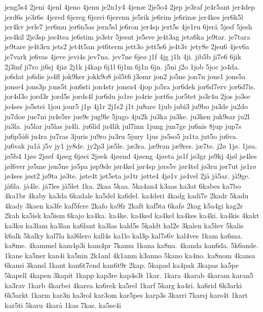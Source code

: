 {jeng5s4
2jeni
4jenl
4jeno
4jenu
je2n1y4
4jen^^e6
2je5o4
2jep
je3raf
je4r5ant
jer4dep
jerd6s
je3r6e
4jered
6jereg
6jerei
6jerenn
je5rik
je6rim
je6rin^^e6
jer4kes
jer6k5l
jer4kv
jerle7
jer6mu
jer6n5as
jern5sl
je6ron
jer4sp
jert5s
4je1ru
6jer^^e5
5jesf
5jesh
jes4kil
2je3sp
jes4tea
je6stim
je3str
5jesut
je5sve
je4t3ag
jeta6ka
je9tar.
je7tara
je9tare
je4t3ru
jets2
jet4t5an
jet6term
jett3o
jett5s6
je4t3v
jety8e
2jeu6
4jev6a
je7vark
je6vas
4jeve
jevi4s
jev7na.
jev7ne
6je^^f8
j1f
4jg
j1h
4ji.
jib5b
ji7e6
6jik
2j3inf
ji7ro
ji6sj
4ji^^f8
2j1k
j4kap
6j1l
6j1m
6j1n
6jn.
j5ni
j2o
1job
5joc
jo4da.
jo6dat
jo6dis
jo4fl
jok9ker
jokk9o8
jol5t6
j3omr
jon2
jo5ne
jon7n
jons1
jons5a
jonse4
jons3p
jons5t
jon6sti
jon4str
jonsu4
4jop
jo5ra
jor6dek
jor6d7erv
jor6d7is.
jor4d3o
jord3r
jord5s
jords4l
jor6du
jo1re
jo4rie
jort6a
jor5tet
jo3r4u
2jos
jo3se
jo4ses
jo5stei
1jou
jour5
j1p
4j1r
2j1s2
j1t
ju8are
1jub
jubi3
ju9bo
ju3de
ju2do
ju7doe
jue7ni
ju4e5re
jue9s
jug9le
5jugo
4ju2k
ju3ka
ju3ke.
ju3ken
juk9sar
ju2l
ju3la.
ju5lar
ju5las
ju4li.
ju6lid
ju4lik
jul7inn
1jung
jun7ge
ju6nis
8jup
jup7s
ju6p5^^e56
ju4ra
ju7ras
3juris
ju9ro
ju3ru
5jury
1jus
ju5so5
ju1ta
jut5o
ju6va.
ju6vak
ju1^^e5
j5v
jy1
jy8de.
jy2p3
j^^e65le.
j^^e63ra.
j^^e69ran
j^^e69res.
j^^e67te.
j2^^f8
1j^^f8.
1j^^f8a.
j^^f85b4
1j^^f8e
2j^^f8ef
4j^^f8eg
6j^^f8ei
2j^^f8ek
4j^^f8end
4j^^f8eng
4j^^f8eta
j^^f81f
j^^f83gr
j^^f89kj
4j^^f8l
j^^f84les
j^^f8l6ver
j^^f85me
j^^f8n5ne
j^^f85pa
j^^f8p9sle
j^^f8r4kel
j^^f8r4sp
j^^f8rs5v
j^^f8r4tel
j^^f83ru
j^^f8r7ut
j^^f81r^^f8
j^^f84ses
j^^f8st2
j^^f89ta
j^^f83te.
j^^f8te4t
j^^f8t5eta
j^^f81tr
j^^f8tte4
4j^^f81v
j^^f84vel
2j^^e5
j^^e55ar.
j^^e59ge.
j^^e56la.
j^^e54le.
j^^e57les
j^^e55let
1ka.
2kaa
5kaa.
5ka4an4
k3aas
ka3at
6kabes
ka7bo
4ka1br
4kaby
ka3da
6kadale
ka5del
ka6del.
ka4deri
4kadg
kadi7e
2kadr
5kadu
4kady
3kaen
ka3fe
kaf5fere
2kafo
ka9fr
2kaft
kaf5ta
6kaf^^f8
2kag
k5a4gi
kag2r
2kah
ka5isk
ka5ism
6kajo
ka4ka.
ka4ke.
ka4ked
ka4kel
ka4kes
ka4ki.
ka4kis
4kakt
ka3ku
ka3lam
ka3lan
ka6lant
ka3las
kald5s
5kaldt
kal2e
3kalen
ka5lev
5kalis
k6alk
5kalky
kal7la
kal6lero
kall4s
ka1lo
kal3p
kal7s6v
kal4ves
1kam
ka6ma.
ka8me.
4kammel
kam4p3i
kam4pr
7kamu
1kana
ka8na.
4kanda
kan6da.
5k6ande.
1kane
ka5ner
kan4i
ka5nin
2k1anl
4k1anm
k3anno
5kano
ka4no.
ka8nom
4kansa
6kansi
3kansl
1kant
kan6t7end
kan6t9r
2kap.
5kapad
ka4pak
3kapas
ka5pe
5kapell
4kapen
3kapit
1kapp
kap3re
kap4s3t
1kar.
1kara
4karab
4karam
karan5
ka3rav
1karb
4karbei
4karea
ka6rek
ka5rel
1karf
5karg
ka4ri.
ka6rid
6k3arki
6k5arkt
1karm
kar3n
ka3rol
kar3om
kar5pes
karp3s
3karri
7karsj
kars4t
1kart
kar5ti
5karu
4kar^^e5
1kas
7kas.
ka5se4i
}
